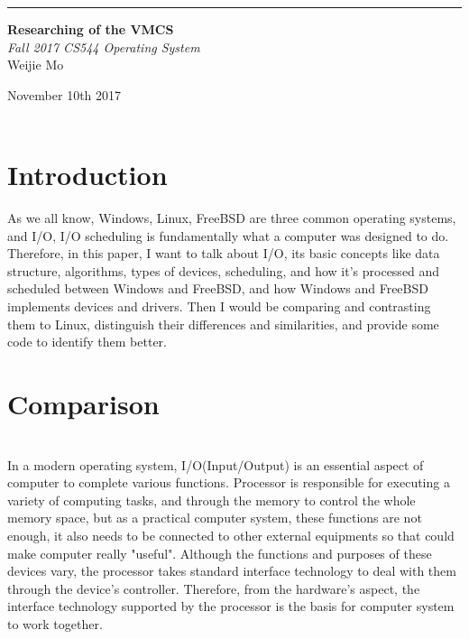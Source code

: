 \documentclass[10pt,draftclsnofoot,peerreview,letterpaper,onecolumn,]{IEEEtran}
\begin{document}
\begin{titlepage} %
	
	\raggedleft %
	
	\rule{1pt}{\textheight} %
	\hspace{0.05\textwidth} %
	\parbox[b]{0.75\textwidth}{ %
		
		{\Huge\bfseries Researching of the VMCS }\\[2\baselineskip] %
		{\large\textit{Fall 2017 CS544 Operating System}}\\[4\baselineskip] %
		{\Large Weijie Mo} %
		
		\vspace{0.5\textheight} %
		
		{\noindent November 10th 2017}\\[\baselineskip] %
        {\noindent }\\[\baselineskip] %
	}

\end{titlepage}

\section{Introduction}

As we all know, Windows, Linux, FreeBSD are three common operating systems, and I/O, I/O scheduling is fundamentally what a computer was designed to do. Therefore, in this paper, I want to talk about I/O, its basic concepts like data structure, algorithms, types of devices, scheduling, and how it’s processed and scheduled between Windows and FreeBSD, and how Windows and FreeBSD implements devices and drivers. Then I would be comparing and contrasting them to Linux, distinguish their differences and similarities, and provide some code to identify them better.
\section{Comparison}
~\\In a modern operating system, I/O(Input/Output) is an essential aspect of computer to complete various functions. Processor is responsible for executing a variety of computing tasks, and through the memory to control the whole memory space, but as a practical computer system, these functions are not enough, it also needs to be connected to other external equipments so that could make computer really "useful". Although the functions and purposes of these devices vary, the processor takes standard interface technology to deal with them through the device's controller. Therefore, from the hardware’s aspect, the interface technology supported by the processor is the basis for computer system to work together.
\end{document}

